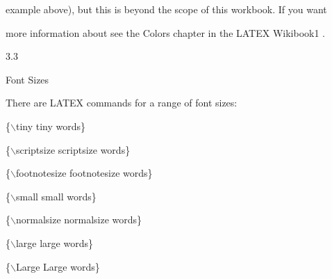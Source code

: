 \documentclass[a4paper,portrait,12pt]{article}
\begin{document}
\begin{flushleft}
example above), but this is beyond the scope of this workbook. If you want
\end{flushleft}


\begin{flushleft}
more information about see the Colors chapter in the LATEX Wikibook1 .
\end{flushleft}





3.3





\begin{flushleft}
Font Sizes
\end{flushleft}





\begin{flushleft}
There are LATEX commands for a range of font sizes:
\end{flushleft}


\begin{flushleft}
\{\ensuremath{\backslash}tiny tiny words\}
\end{flushleft}


\begin{flushleft}
\{\ensuremath{\backslash}scriptsize scriptsize words\}
\end{flushleft}


\begin{flushleft}
\{\ensuremath{\backslash}footnotesize footnotesize words\}
\end{flushleft}


\begin{flushleft}
\{\ensuremath{\backslash}small small words\}
\end{flushleft}


\begin{flushleft}
\{\ensuremath{\backslash}normalsize normalsize words\}
\end{flushleft}


\begin{flushleft}
\{\ensuremath{\backslash}large large words\}
\end{flushleft}


\begin{flushleft}
\{\ensuremath{\backslash}Large Large words\}
\end{flushleft}
\end{document}
